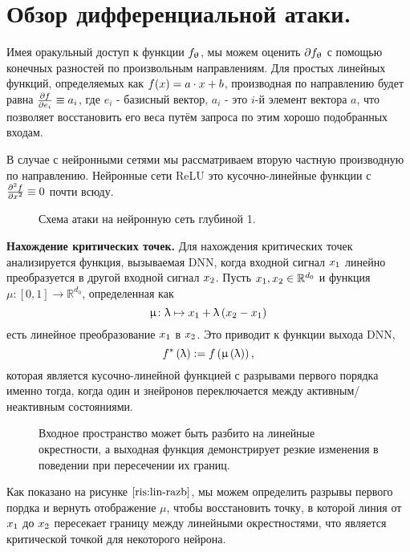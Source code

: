 
\section{Обзор дифференциальной атаки.}
 Имея оракульный доступ к функции $ \mathnormal{f}_{\theta}$, мы можем оценить $\partial  \mathnormal{f}_{\theta}$ с помощью конечных разностей по произвольным направлениям. Для простых линейных функций, определяемых как $ \mathnormal{f}( \mathnormal{x}) = a \cdot  \mathnormal{x} + b$, производная по направлению будет равна $\frac {\partial  \mathnormal{f}}{\partial e_{i}} \equiv a_{i}$, где $e_{i}$ - базисный вектор, $a_{i}$ - это $i$-й элемент вектора $a$, что позволяет восстановить его веса путём запроса по этим хорошо подобранных входам.

  В случае с нейронными сетями мы рассматриваем вторую частную производную по направлению. Нейронные сети ReLU это кусочно-линейные функции с $\frac {\partial ^ 2  \mathnormal{f}}{\partial  \mathnormal{x}^2} \equiv 0$ почти всюду.

\begin{figure}[h]
	\caption{Схема атаки на нейронную сеть глубиной 1.}
	\label{ris:1-layer}
\end{figure}

\textbf{Нахождение критических точек.} Для нахождения критических точек анализируется функция, вызываемая DNN, когда входной сигнал $\mathnormal{x}_{1}$ линейно преобразуется в другой входной сигнал $\mathnormal{x}_{2}$. Пусть $\mathnormal{x}_{1}, \mathnormal{x}_{2} \in \mathbb{R}^{d_{0}}$ и  функция $\mu \colon \left[0, 1\right] \to \mathbb{R}^{d_{0}}$, определенная как
$$\mu \colon \lambda \mapsto \mathnormal{x}_{1} + \lambda \left( \mathnormal{x}_{2} - \mathnormal{x}_{1} \right)$$
есть линейное преобразование $\mathnormal{x}_{1}$ в $\mathnormal{x}_{2}$. Это приводит к функции выхода DNN, 
$$\mathnormal{f}^{*}\left( \lambda \right) := \mathnormal{f}\left( \mu \left( \lambda \right) \right),$$
которая является кусочно-линейной функцией с разрывами первого порядка именно тогда, когда один и знейронов переключается между активным/неактивным состояниями.

\begin{figure}[h]
	\caption{Входное пространство может быть разбито на линейные окрестности,  а выходная функция демонстрирует резкие изменения в поведении при пересечении их границ.}
	\label{ris:lin-razb}
\end{figure}
Как показано на рисунке $\ref{ris:lin-razb}$, мы можем определить разрывы первого пордка и вернуть отображение $\mu$, чтобы восстановить точку, в которой линия от $\mathnormal{x}_{1}$ до $\mathnormal{x}_{2}$ пересекает границу между линейными окрестностями, что является критической точкой для некоторого нейрона.


